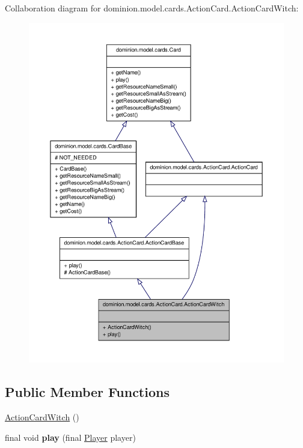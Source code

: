 \-Collaboration diagram for dominion.\-model.\-cards.\-Action\-Card.\-Action\-Card\-Witch\-:
\nopagebreak
\begin{figure}[H]
\begin{center}
\leavevmode
\includegraphics[width=350pt]{classdominion_1_1model_1_1cards_1_1ActionCard_1_1ActionCardWitch__coll__graph}
\end{center}
\end{figure}
\subsection*{\-Public \-Member \-Functions}
\begin{DoxyCompactItemize}
\item 
\hyperlink{classdominion_1_1model_1_1cards_1_1ActionCard_1_1ActionCardWitch_a93f5dad1b623e6b8a98bd586565a1191}{\-Action\-Card\-Witch} ()
\item 
\hypertarget{classdominion_1_1model_1_1cards_1_1ActionCard_1_1ActionCardWitch_a348ac9e73d57b55400adb385f5744e8d}{final void {\bfseries play} (final \hyperlink{interfacedominion_1_1model_1_1Player}{\-Player} player)}\label{classdominion_1_1model_1_1cards_1_1ActionCard_1_1ActionCardWitch_a348ac9e73d57b55400adb385f5744e8d}

\end{DoxyCompactItemize}


